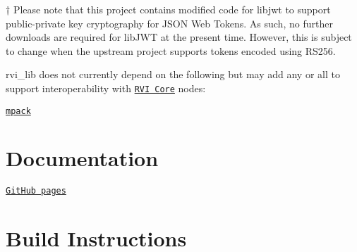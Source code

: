 † Please note that this project contains modified code for libjwt to support public-\/private key cryptography for J\+S\+ON Web Tokens. As such, no further downloads are required for lib\+J\+WT at the present time. However, this is subject to change when the upstream project supports tokens encoded using R\+S256.

{\ttfamily rvi\+\_\+lib} does not currently depend on the following but may add any or all to support interoperability with \href{https://github.com/GENIVI/rvi_core}{\tt R\+VI Core} nodes\+:


\begin{DoxyEnumerate}
\item \href{http://ludocode.github.io/mpack/}{\tt mpack}
\end{DoxyEnumerate}

\section*{Documentation}

\href{http://genivi.github.io/rvi_lib}{\tt Git\+Hub pages}

\section*{Build Instructions}